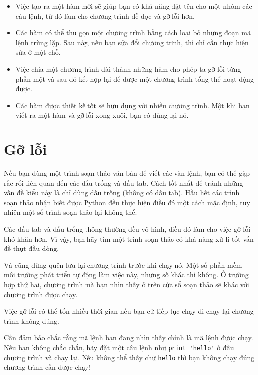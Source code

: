 \documentclass[11pt]{book}
\begin{document}
\begin{itemize}

\item Việc tạo ra một hàm mới sẽ giúp bạn có khả năng đặt tên
cho một nhóm các câu lệnh, từ đó làm cho chương trình dễ đọc
và gỡ lỗi hơn.

\item Các hàm có thể thu gọn một chương trình bằng cách loại bỏ
những đoạn mã lệnh trùng lặp. Sau này, nếu bạn sửa đổi chương trình,
thì chỉ cần thực hiện sửa ở một chỗ.

\item Việc chia một chương trình dài thành những hàm cho phép ta 
gỡ lỗi từng phần một và sau đó kết hợp lại để được một chương trình
tổng thể hoạt động được.

\item Các hàm được thiết kế tốt sẽ hữu dụng với nhiều chương trình.
Một khi bạn viết ra một hàm và gỡ lỗi xong xuôi, bạn có dùng lại nó.

\end{itemize}


\section{Gỡ lỗi}
\label{editor}

Nếu bạn dùng một trình soạn thảo văn bản để viết các văn lệnh,
bạn có thể gặp rắc rối liên quan đến các dấu trống và dấu tab. 
Cách tốt nhất để tránh những vấn đề kiểu này là chỉ dùng dấu
trống (không có dấu tab). Hầu hết các trình soạn thảo nhận biết
được Python đều thực hiện điều đó một cách mặc định, tuy nhiên
một số trình soạn thảo lại không thể.


Các dấu tab và dấu trống thông thường đều vô hình, điều đó làm
cho việc gỡ lỗi khó khăn hơn. Vì vậy, bạn hãy tìm một trình 
soạn thảo có khả năng xử lí tốt vấn đề thụt đầu dòng.

Và cũng đừng quên lưu lại chương trình trước khi chạy nó. Một số
phần mềm môi trường phát triển tự động làm việc này, nhưng số khác
thì không. Ở trường hợp thứ hai, chương trình mà bạn nhìn thấy ở
trên cửa sổ soạn thảo sẽ khác với chương trình được chạy.

Việc gỡ lỗi có thể tốn nhiều thời gian nếu bạn cứ tiếp tục chạy
đi chạy lại chương trình không đúng.

Cần đảm bảo chắc rằng mã lệnh bạn đang nhìn thấy chính là mã lệnh
được chạy. Nếu bạn không chắc chắn, hãy đặt một câu lệnh như 
\verb"print 'hello'" ở đầu chương trình và chạy lại. Nếu không
thể thấy chữ \verb"hello" thì bạn không chạy đúng chương trình
cần được chạy!
\end{document}

